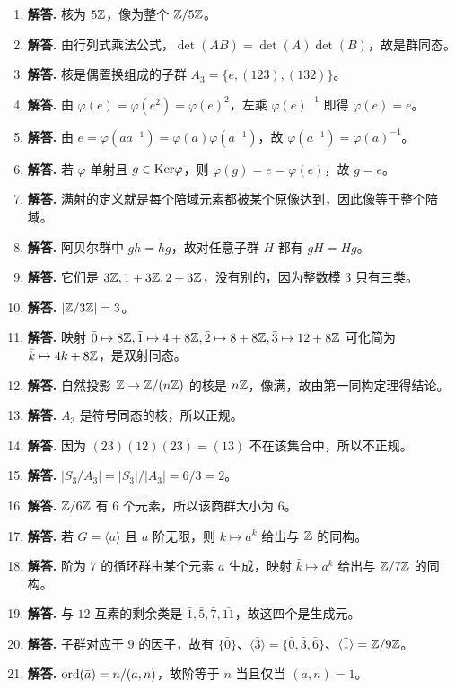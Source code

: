 \begin{enumerate}[label=\textbf{\arabic*.}, leftmargin=*, itemsep=1em]
\item \textbf{解答.} 核为 $5\mathbb{Z}$，像为整个 $\mathbb{Z}/5\mathbb{Z}$。
\item \textbf{解答.} 由行列式乘法公式，$\det(AB)=\det(A)\det(B)$，故是群同态。
\item \textbf{解答.} 核是偶置换组成的子群 $A_3=\{e,(123),(132)\}$。
\item \textbf{解答.} 由 $\varphi(e)=\varphi(e^2)=\varphi(e)^2$，左乘 $\varphi(e)^{-1}$ 即得 $\varphi(e)=e$。
\item \textbf{解答.} 由 $e=\varphi(aa^{-1})=\varphi(a)\varphi(a^{-1})$，故 $\varphi(a^{-1})=\varphi(a)^{-1}$。
\item \textbf{解答.} 若 $\varphi$ 单射且 $g\in\mathrm{Ker}\varphi$，则 $\varphi(g)=e=\varphi(e)$，故 $g=e$。
\item \textbf{解答.} 满射的定义就是每个陪域元素都被某个原像达到，因此像等于整个陪域。
\item \textbf{解答.} 阿贝尔群中 $gh=hg$，故对任意子群 $H$ 都有 $gH=Hg$。
\item \textbf{解答.} 它们是 $3\mathbb{Z},1+3\mathbb{Z},2+3\mathbb{Z}$，没有别的，因为整数模 $3$ 只有三类。
\item \textbf{解答.} $|\mathbb{Z}/3\mathbb{Z}|=3$。
\item \textbf{解答.} 映射 $\bar0\mapsto8\mathbb{Z},\bar1\mapsto4+8\mathbb{Z},\bar2\mapsto8+8\mathbb{Z},\bar3\mapsto12+8\mathbb{Z}$ 可化简为 $\bar k\mapsto4k+8\mathbb{Z}$，是双射同态。
\item \textbf{解答.} 自然投影 $\mathbb{Z}\to \mathbb{Z}/(n\mathbb{Z})$ 的核是 $n\mathbb{Z}$，像满，故由第一同构定理得结论。
\item \textbf{解答.} $A_3$ 是符号同态的核，所以正规。
\item \textbf{解答.} 因为 $(23)(12)(23)=(13)$ 不在该集合中，所以不正规。
\item \textbf{解答.} $|S_3/A_3|=|S_3|/|A_3|=6/3=2$。
\item \textbf{解答.} $\mathbb{Z}/6\mathbb{Z}$ 有 $6$ 个元素，所以该商群大小为 $6$。
\item \textbf{解答.} 若 $G=\langle a\rangle$ 且 $a$ 阶无限，则 $k\mapsto a^k$ 给出与 $\mathbb{Z}$ 的同构。
\item \textbf{解答.} 阶为 $7$ 的循环群由某个元素 $a$ 生成，映射 $\bar k\mapsto a^k$ 给出与 $\mathbb{Z}/7\mathbb{Z}$ 的同构。
\item \textbf{解答.} 与 $12$ 互素的剩余类是 $\bar1,\bar5,\bar7,\bar{11}$，故这四个是生成元。
\item \textbf{解答.} 子群对应于 $9$ 的因子，故有 $\{\bar0\}$、$\langle\bar3\rangle=\{\bar0,\bar3,\bar6\}$、$\langle\bar1\rangle=\mathbb{Z}/9\mathbb{Z}$。
\item \textbf{解答.} $\mathrm{ord}(\bar a)=n/(a,n)$，故阶等于 $n$ 当且仅当 $(a,n)=1$。

\end{enumerate}
